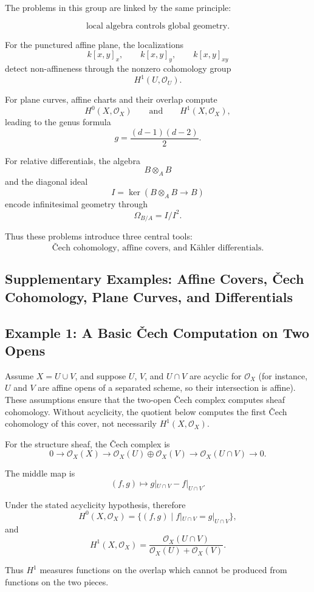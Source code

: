 The problems in this group are linked by the same principle:

\[
\boxed{
	\text{local algebra controls global geometry.}
}
\]

For the punctured affine plane, the localizations
\[
k[x,y]_x,
\qquad
k[x,y]_y,
\qquad
k[x,y]_{xy}
\]
detect non-affineness through the nonzero cohomology group
\[
H^1(U,\mathcal O_U).
\]

For plane curves, affine charts and their overlap compute
\[
H^0(X,\mathcal O_X)
\qquad\text{and}\qquad
H^1(X,\mathcal O_X),
\]
leading to the genus formula
\[
g=\frac{(d-1)(d-2)}2.
\]

For relative differentials, the algebra
\[
B\otimes_A B
\]
and the diagonal ideal
\[
I=\ker(B\otimes_A B\to B)
\]
encode infinitesimal geometry through
\[
\Omega_{B/A}=I/I^2.
\]

Thus these problems introduce three central tools:
\[
\boxed{
	\text{\v{C}ech cohomology, affine covers, and K\"ahler differentials.}
}
\]
\subsection*{Supplementary Examples: Affine Covers, \v{C}ech Cohomology, Plane Curves, and Differentials}

\subsection{Example 1: A Basic \v{C}ech Computation on Two Opens}

Assume $X=U\cup V$, and suppose $U$, $V$, and $U\cap V$ are
acyclic for $\mathcal O_X$ (for instance, $U$ and $V$ are affine
opens of a separated scheme, so their intersection is affine). These
assumptions ensure that the two-open \v{C}ech complex computes sheaf
cohomology. Without acyclicity, the quotient below computes the first
\v{C}ech cohomology of this cover, not necessarily $H^1(X,\mathcal O_X)$.

For the structure sheaf, the \v{C}ech complex is
\[
0
\longrightarrow
\mathcal O_X(X)
\longrightarrow
\mathcal O_X(U)\oplus\mathcal O_X(V)
\longrightarrow
\mathcal O_X(U\cap V)
\longrightarrow 0.
\]

The middle map is
\[
(f,g)
\longmapsto
g|_{U\cap V}-f|_{U\cap V}.
\]

Under the stated acyclicity hypothesis, therefore
\[
H^0(X,\mathcal O_X)
=
\{(f,g)\mid f|_{U\cap V}=g|_{U\cap V}\},
\]
and
\[
H^1(X,\mathcal O_X)
=
\frac{\mathcal O_X(U\cap V)}
{\mathcal O_X(U)+\mathcal O_X(V)}.
\]

Thus $H^1$ measures functions on the overlap which cannot be produced from
functions on the two pieces.
